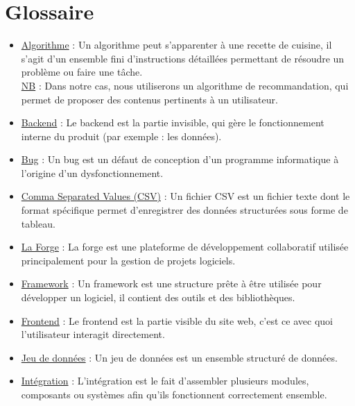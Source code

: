\documentclass[a4paper,12pt]{report}
\begin{document}
\chapter*{Glossaire}
\label{BE2}
\begin{itemize}
    \item \underline{Algorithme} : Un algorithme peut s'apparenter à une recette de cuisine, il s'agit d'un ensemble fini d'instructions détaillées permettant de résoudre un problème ou faire une tâche.\\
    \underline{NB} : Dans notre cas, nous utiliserons un algorithme de recommandation, qui permet de proposer des contenus pertinents à un utilisateur.
    
    \item \underline{Backend} : Le backend est la partie invisible, qui gère le fonctionnement interne du produit (par exemple : les données).
    
    \item \underline{Bug} : Un bug est un défaut de conception d'un programme informatique à l'origine d'un dysfonctionnement.
    
    \item \underline{Comma Separated Values (CSV)} : Un fichier CSV est un fichier texte dont le format spécifique permet d'enregistrer des données structurées sous forme de tableau.
    
    \item \underline{La Forge} : La forge est une plateforme de développement collaboratif utilisée principalement pour la gestion de projets logiciels.
    
    \item \underline{Framework} : Un framework est une structure prête à être utilisée pour développer un logiciel, il contient des outils et des bibliothèques.
    
    \item \underline{Frontend} : Le frontend est la partie visible du site web, c'est ce avec quoi l'utilisateur interagit directement.
    
    \item \underline{Jeu de données} : Un jeu de données est un ensemble structuré de données. 
    
    \item \underline{Intégration} : L'intégration est le fait d'assembler plusieurs modules, composants ou systèmes afin qu'ils fonctionnent correctement ensemble.
    

\end{itemize}
\end{document}
